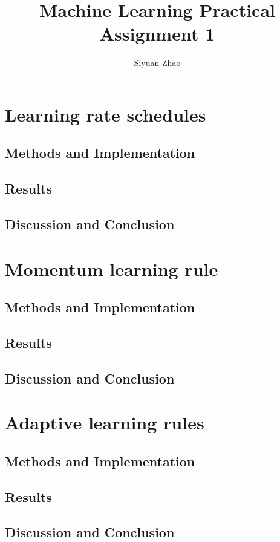 \documentclass[11pt]{article}
\begin{document}
\title{Machine Learning Practical \\Assignment 1}

\author{Siyuan Zhao}
\maketitle
\section{Learning rate schedules}
\subsection{Methods and Implementation}
\subsection{Results}
\subsection{Discussion and Conclusion}

\section{Momentum learning rule}
\subsection{Methods and Implementation}
\subsection{Results}
\subsection{Discussion and Conclusion}

\section{Adaptive learning rules}
\subsection{Methods and Implementation}
\subsection{Results}
\subsection{Discussion and Conclusion}
\end{document}
